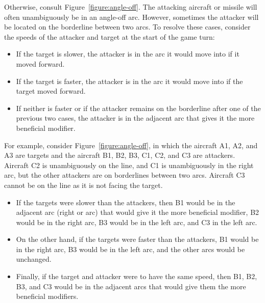{{Otherwise, consult Figure~\ref{figure:angle-off}. The attacking aircraft or missile will often unambiguously be in an angle-off arc. However, sometimes the attacker will be located on the borderline between two arcs. To resolve these cases, consider the speeds of the attacker and target at the start of the game turn:
\begin{itemize}
\item If the target is slower, the attacker is in the arc it would move into if it moved forward.
\item If the target is faster, the attacker is in the arc it would move into if the target moved forward.
\item If neither is faster or if the attacker remains on the borderline after one of the previous two cases, the attacker is in the adjacent arc that gives it the more beneficial modifier.
\end{itemize}

For example, consider Figure~\ref{figure:angle-off}, in which the aircraft A1, A2, and A3 are targets and the aircraft B1, B2,  B3, C1, C2, and C3 are attackers. Aircraft C2 is unambiguously on the  line, and C1 is unambiguously in the right  arc, but the other attackers are on borderlines between two arcs. Aircraft C3 cannot be on the  line as it is not facing the target.

\begin{itemize}

\item
If the targets were slower than the attackers, then B1 would be in the adjacent arc (right  or  arc) that would give it the more beneficial modifier, B2 would be in the right  arc, B3 would be in the left  arc, and C3 in the left  arc. 

\item
On the other hand, if the targets were faster than the attackers, B1 would be in the right  arc, B3 would be in the left  arc, and the other arcs would be unchanged. 

\item
Finally, if the target and attacker were to have the same speed, then B1, B2, B3, and C3 would be in the adjacent arcs that would give them the more beneficial modifiers. 

\end{itemize}

}}
